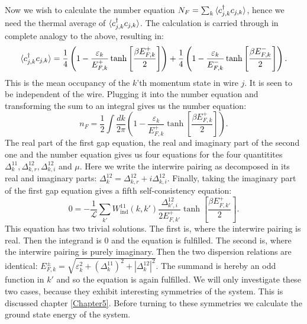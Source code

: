Now we wish to calculate the number equation $N_F = \sum_k \braket{c^\dagger_{j,k}c_{j,k}}$, hence we need the thermal average of $\braket{c^\dagger_{j,k}c_{j,k}}$. The calculation is carried through in complete analogy to the above, resulting in:
\begin{equation}
\braket{c^\dagger_{j,k}c_{j,k}} = \frac{1}{4}\left( 1 - \frac{\varepsilon_k}{E^{+}_{F,k}}\tanh\left[\frac{\beta E^{+}_{F,k}}{2}\right] \right) + \frac{1}{4}\left( 1 - \frac{\varepsilon_k}{E^{-}_{F,k}}\tanh\left[\frac{\beta E^{-}_{F,k}}{2}\right] \right).
\label{eq.meanoccupancy}
\end{equation}
This is the mean occupancy of the $k$'th momentum state in wire $j$. It is seen to be independent of the wire. Plugging it into the number equation and transforming the sum to an integral gives us the number equation:
\begin{equation}
n_F = \frac{1}{2}\int \frac{dk}{2\pi} \left( 1 - \frac{\varepsilon_k}{E^{+}_{F,k}}\tanh\left[\frac{\beta E^{+}_{F,k}}{2}\right] \right). 
\label{eq.2wiresnumberequation}
\end{equation}
The real part of the first gap equation, the real and imaginary part of the second one and the number equation gives us four equations for the four quantitites $\Delta^{11}_k, \Delta^{12}_{k,r}, \Delta^{12}_{k,i} $ and $\mu$. Here we write the interwire pairing as decomposed in its real and imaginary parts: $\Delta^{12}_k = \Delta^{12}_{k,r} + i\Delta^{12}_{k,i}$. Finally, taking the imaginary part of the first gap equation gives a fifth self-consistency equation:
\begin{equation}
0 = -\frac{1}{\mathcal{L}}\sum_{k'} W_{\text{ind}}^{11}(k, k')\frac{\Delta^{12}_{k',i}}{2E^{+}_{F,k'}}\tanh\left[\frac{\beta E^{+}_{F,k'}}{2}\right].
\end{equation}
This equation has two trivial solutions. The first is, where the interwire pairing is real. Then the integrand is 0 and the equation is fulfilled. The second is, where the interwire pairing is purely imaginary. Then the two dispersion relations are identical: $E^{\pm}_{F,k} = \sqrt{\varepsilon_k^2 + (\Delta^{11}_k)^2 + |\Delta^{12}_k|^2}$. The summand is hereby an odd function in $k'$ and so the equation is again fulfilled. We will only investigate these two cases, because they exhibit interesting symmetries of the system. This is discussed chapter \ref{Chapter5}. Before turning to these symmetries we calculate the ground state energy of the system. 

